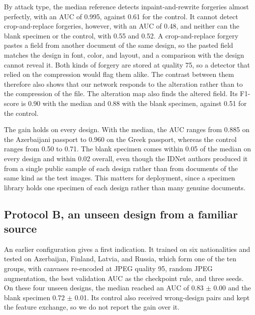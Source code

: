 \documentclass[12pt,a4paper]{article}
\newif\ifshowguidance
\newcommand{\todo}[1]{\ifshowguidance\leavevmode{\color{gray}\itshape [#1]}\fi}
\begin{document}
By attack type, the median reference detects inpaint-and-rewrite forgeries almost perfectly, with an AUC of 0.995, against 0.61 for the control. It cannot detect crop-and-replace forgeries, however, with an AUC of 0.48, and neither can the blank specimen or the control, with 0.55 and 0.52. A crop-and-replace forgery pastes a field from another document of the same design, so the pasted field matches the design in font, color, and layout, and a comparison with the design cannot reveal it. Both kinds of forgery are stored at quality 75, so a detector that relied on the compression would flag them alike. The contrast between them therefore also shows that our network responds to the alteration rather than to the compression of the file. The alteration map also finds the altered field. Its F1-score is 0.90 with the median and 0.88 with the blank specimen, against 0.51 for the control.

The gain holds on every design. With the median, the AUC ranges from 0.885 on the Azerbaijani passport to 0.960 on the Greek passport, whereas the control ranges from 0.50 to 0.71. The blank specimen comes within 0.05 of the median on every design and within 0.02 overall, even though the IDNet authors produced it from a single public sample of each design rather than from documents of the same kind as the test images. This matters for deployment, since a specimen library holds one specimen of each design rather than many genuine documents.

\subsection{Protocol B, an unseen design from a familiar source}
\label{sec:resB}
\todo{Protocol B (30 runs, namely the fair control, the median, and the blank specimen over the ten nationality groups) starts after the gate decision. Table in the layout of Table~\ref{tab:resA}, with the results for each test nationality and the transported threshold. Delete the next paragraph once the table is in.}

An earlier configuration gives a first indication. It trained on six nationalities and tested on Azerbaijan, Finland, Latvia, and Russia, which form one of the ten groups, with canvases re-encoded at JPEG quality 95, random JPEG augmentation, the best validation AUC as the checkpoint rule, and three seeds. On these four unseen designs, the median reached an AUC of 0.83 $\pm$ 0.00 and the blank specimen 0.72 $\pm$ 0.01. Its control also received wrong-design pairs and kept the feature exchange, so we do not report the gain over it.
\end{document}
